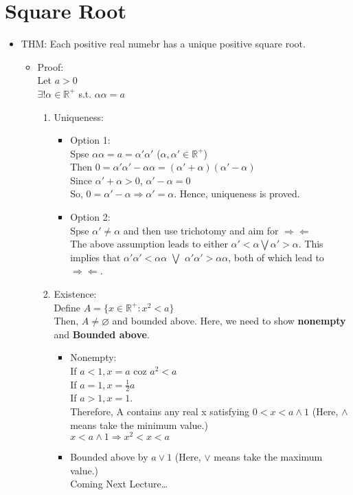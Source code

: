 \documentclass[11pt]{article}
\begin{document}
\section{Square Root}
\label{sec:org3ed687e}
\begin{itemize}
\item THM: Each positive real numebr has a unique positive square root.
\begin{itemize}
\item Proof: \\[0pt]
Let \(a > 0\)\\[0pt]
\(\exists ! \alpha \in \mathbb{R}^+\) s.t. \(\alpha\alpha = a\)\\[0pt]
\begin{enumerate}
\item Uniqueness: \\[0pt]
\begin{itemize}
\item Option 1: \\[0pt]
Spse \(\alpha\alpha = a = \alpha' \alpha'\) (\(\alpha, \alpha' \in \mathbb{R}^+\))\\[0pt]
Then \(0 = \alpha'\alpha' - \alpha\alpha = (\alpha'+\alpha)(\alpha' - \alpha)\)\\[0pt]
Since \(\alpha' + \alpha > 0\), \(\alpha' - \alpha = 0\) \\[0pt]
So, \(0 = \alpha' - \alpha \Rightarrow \alpha' = \alpha\).
Hence, uniqueness is proved.
\item Option 2: \\[0pt]
Spse \(\alpha' \neq \alpha\) and then use trichotomy and aim for \(\Rightarrow\!\Leftarrow\)\\[0pt]
The above assumption leads to either \(\alpha' < \alpha \bigvee \alpha' > \alpha\). This implies that \(\alpha' \alpha' < \alpha\alpha\) \(\bigvee\) \(\alpha' \alpha' > \alpha\alpha\), both of which lead to \(\Rightarrow\!\Leftarrow\).
\end{itemize}
\item Existence:\\[0pt]
Define \(A = \{x\in \mathbb{R}^+: x^2<a \}\)\\[0pt]
Then, \(A \neq \varnothing\) and bounded above. Here, we need to show \textbf{nonempty} and \textbf{Bounded above}.
\begin{itemize}
\item Nonempty:\\[0pt]
If \(a<1, x=a\) coz \(a^2<a\)\\[0pt]
If \(a = 1, x= \frac{1}{2}a\)\\[0pt]
If \(a > 1, x = 1\).\\[0pt]
Therefore, A contains any real x satisfying \(0 < x < a \wedge 1\) (Here, \(\wedge\) means take the minimum value.)\\[0pt]
\(x < a \wedge 1 \Rightarrow x^{2}<x < a\)
\item Bounded above by \(a \vee 1\) (Here, \(\vee\) means take the maximum value.)\\[0pt]
Coming Next Lecture\ldots{}
\end{itemize}
\end{enumerate}
\end{itemize}
\end{itemize}
\end{document}
